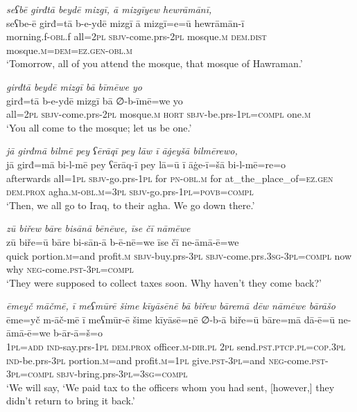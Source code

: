 \ea \label{BP.54}
\textit{seʕbē girđtā beydē mizgī, ā mizgīyew hewrāmānī,} \\ 
\gll seʕbe-ē girđ=tā b-e-ydē mizgī ā mizgī=e=ū hewrāmān-ī \\ 
 morning.f\textsc{-obl}.f all=\textsc{2pl} \textsc{sbjv-}come.prs-\textsc{2pl} mosque\textsc{.m} \textsc{dem.dist} mosque\textsc{.m}\textsc{=dem}\textsc{=ez.gen}\textsc{-obl}\textsc{.m} \\ 
\glt `Tomorrow, all of you attend the mosque, that mosque of Hawraman.'
\z 
 
\ea \label{BP.55}
\textit{girđtā beydē mizgī bā bīmēwe yo} \\ 
\gll girđ=tā b-e-ydē mizgī bā ∅-b-īmē=we yo \\ 
 all=\textsc{2pl} \textsc{sbjv-}come.prs-\textsc{2pl} mosque\textsc{.m} \textsc{hort} \textsc{sbjv-}be.prs-\textsc{1pl}\textsc{=compl} one\textsc{.m} \\ 
\glt `You all come to the mosque; let us be one.'
\z 
 
\ea \label{BP.56}
\textit{jā girđmā bilmē pey ʕērāqī pey lāw ī āġeyšā bilmērewo,} \\ 
\gll jā girđ=mā bi-l-mē pey ʕērāq-ī pey lā=ū ī āġe-ī=šā bi-l-mē=re=o \\ 
 afterwards all\textsc{=\textsc{1pl}} \textsc{sbjv-}go.prs\textsc{-\textsc{1pl}} for \textsc{pn}\textsc{-obl}\textsc{.m} for at\_the\_place\_of\textsc{=ez.gen} \textsc{dem.prox} agha\textsc{.m}\textsc{-obl}\textsc{.m}\textsc{=3pl} \textsc{sbjv-}go.prs\textsc{-\textsc{1pl}}\textsc{=\textsc{povb}}\textsc{=compl} \\ 
\glt `Then, we all go to Iraq, to their agha. We go down there.'
\z 
 
\ea \label{BP.58}
\textit{zū biřew bāre bisānā bēnēwe, īse čī nāmēwe} \\ 
\gll zū biře=ū bāre bi-sān-ā b-ē-nē=we īse čī ne-āmā-ē=we \\ 
 quick portion\textsc{.m}=and profit\textsc{.m} \textsc{sbjv-}buy.prs\textsc{-3pl} \textsc{sbjv-}come.prs\textsc{.3sg}\textsc{-3pl}\textsc{=compl} now why \textsc{neg-}come\textsc{.pst}\textsc{-3pl}\textsc{=compl} \\ 
\glt `They were supposed to collect taxes soon. Why haven’t they come back?'
\z 
 
\ea \label{BP.60}
\textit{ēmeyč māčmē, ī meʕmūrē šime kīyāsēnē bā biřew bāremā dēw nāmēwe bārāšo} \\ 
\gll ēme=yč m-āč-mē ī meʕmūr-ē šime kīyāsē=nē ∅-b-ā biře=ū bāre=mā dā-ē=ū ne-āmā-ē=we b-ār-ā=š=o \\ 
 \textsc{1pl}\textsc{=add} \textsc{ind-}say.prs\textsc{-\textsc{1pl}} \textsc{dem.prox} officer\textsc{.m}\textsc{-dir}\textsc{.pl} \textsc{2pl} send\textsc{.pst}\textsc{.ptcp}\textsc{.pl}\textsc{=cop}\textsc{.3pl} \textsc{ind-}be.prs\textsc{-3pl} portion\textsc{.m}=and profit\textsc{.m}\textsc{=\textsc{1pl}} give\textsc{.pst}\textsc{-3pl}=and \textsc{neg-}come\textsc{.pst}\textsc{-3pl}\textsc{=compl} \textsc{sbjv-}bring.prs\textsc{-3pl}\textsc{=3sg}\textsc{=compl} \\ 
\glt `We will say, ‘We paid tax to the officers whom you had sent, [however,] they didn’t return to bring it back.'
\z 
 
